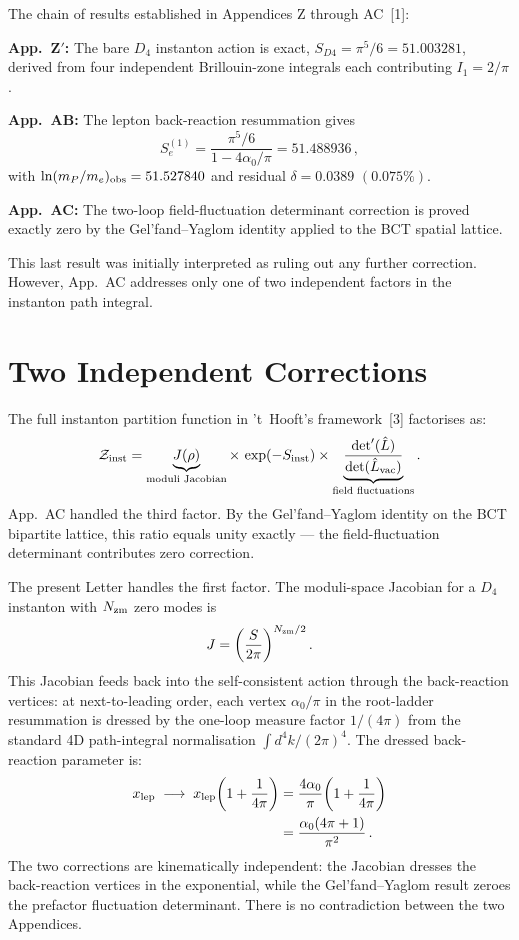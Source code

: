 \documentclass[10pt,twocolumn]{article}
\begin{document}
The chain of results established in Appendices Z through AC~[1]:

\textbf{App.~Z$'$:} The bare $D_4$ instanton action is exact,
$S_{D4} = \pi^5/6 = 51.003281$, derived from four independent Brillouin-zone integrals each
contributing $I_1 = 2/\pi$.

\textbf{App.~AB:} The lepton back-reaction resummation gives
\begin{equation}
S_e^{(1)} = \frac{\pi^5/6}{1 - 4\alpha_0/\pi} = 51.488936\,,
\label{eq:SeAB}
\end{equation}
with $\ln(m_P/m_e)_{\rm obs} = 51.527840$ and residual $\delta = 0.0389$ $(0.075\%)$.

\textbf{App.~AC:} The two-loop field-fluctuation determinant correction is proved exactly zero
by the Gel'fand--Yaglom identity applied to the BCT spatial lattice.

This last result was initially interpreted as ruling out any further correction. However,
App.~AC addresses only one of two independent factors in the instanton path integral.

\section{Two Independent Corrections}

The full instanton partition function in 't~Hooft's framework~[3] factorises as:
\begin{equation}
\mathcal{Z}_{\rm inst}
  = \underbrace{J(\rho)}_{\text{moduli Jacobian}}
    \times\,\exp(-S_{\rm inst})
    \times \underbrace{\frac{\det'(\hat{L})}{\det(\hat{L}_{\rm vac})}}_{\text{field fluctuations}}.
\label{eq:Zinst}
\end{equation}
App.~AC handled the third factor. By the Gel'fand--Yaglom identity on the BCT bipartite lattice,
this ratio equals unity exactly --- the field-fluctuation determinant contributes zero correction.

The present Letter handles the first factor. The moduli-space Jacobian for a $D_4$ instanton
with $N_{\rm zm}$ zero modes is
\begin{equation}
J = \left(\frac{S}{2\pi}\right)^{N_{\rm zm}/2}.
\label{eq:Jacobian}
\end{equation}
This Jacobian feeds back into the self-consistent action through the back-reaction vertices: at
next-to-leading order, each vertex $\alpha_0/\pi$ in the root-ladder resummation is dressed by
the one-loop measure factor $1/(4\pi)$ from the standard 4D path-integral normalisation
$\int d^4k/(2\pi)^4$. The dressed back-reaction parameter is:
\begin{align}
x_{\rm lep} \;\longrightarrow\;
  x_{\rm lep}\!\left(1+\frac{1}{4\pi}\right)
  &= \frac{4\alpha_0}{\pi}\!\left(1+\frac{1}{4\pi}\right) \notag\\
  &= \frac{\alpha_0(4\pi+1)}{\pi^2}\,.
\label{eq:xdressed}
\end{align}
The two corrections are kinematically independent: the Jacobian dresses the back-reaction
vertices in the exponential, while the Gel'fand--Yaglom result zeroes the prefactor fluctuation
determinant. There is no contradiction between the two Appendices.
\end{document}
